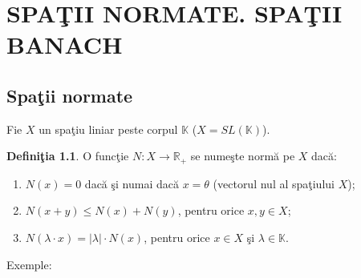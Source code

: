 \documentclass[ a4paper, 12pt]{report}
\theoremstyle{definition}
\newtheorem{definition}{\bf Defini\c tia}[section]
\theoremstyle{remark}
\numberwithin{equation}{section}
\begin{document}
\chapter{SPA\c TII NORMATE. SPA\c TII BANACH}
\section{Spa\c tii normate}
Fie $X$ un spa\c tiu liniar peste corpul $\mathbb{K}$ ($X= SL(\mathbb{K})$).
\begin{definition}
O func\c tie $N : X \rightarrow \mathbb{R}_{+}$ se nume\c ste norm\u a pe $X$ dac\u a:
\begin{enumerate}[($n_1$)]
\item $N(x) = 0$ dac\u a \c si numai dac\u a $x = \theta$ (vectorul nul al spa\c tiului $X$);
\item $N(x + y) \leq N(x) + N(y)$, pentru orice $x,y \in X$;
\item $N(\lambda \cdot x) = \lvert \lambda\rvert \cdot N(x)$, pentru orice $x \in X$ \c si $\lambda \in \mathbb{K}$.
\end{enumerate}
\end{definition}
Exemple:
\end{document}
